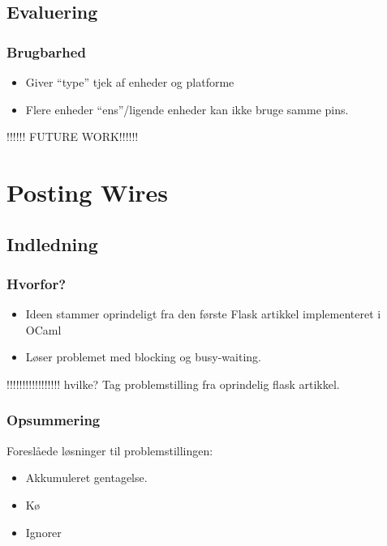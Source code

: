 \documentclass[t]{beamer}
\begin{document}
\subsection{Evaluering}

\begin{frame}
  \frametitle{Brugbarhed}
  
  \begin{itemize}
  \item Giver "`type"' tjek af enheder og platforme

  \item Flere enheder "`ens"'/ligende enheder kan ikke bruge samme pins.
  \end{itemize}


  !!!!!! FUTURE WORK!!!!!!

\end{frame}

\section{Posting Wires}

\subsection{Indledning}

\begin{frame}
  \frametitle{Hvorfor?}

  \begin{itemize}
  \item Ideen stammer oprindeligt fra den første Flask artikkel implementeret i
    OCaml

  \item Løser problemet med blocking og busy-waiting.
  \end{itemize}

!!!!!!!!!!!!!!!!!  hvilke? Tag problemstilling fra oprindelig flask artikkel.

\end{frame}


  
\begin{frame}
  \frametitle{Opsummering}

  Foreslåede løsninger til problemstillingen:

  \begin{itemize}
  \item Akkumuleret gentagelse.
  \item Kø
  \item Ignorer
  \end{itemize}

\end{frame}
\end{document}
